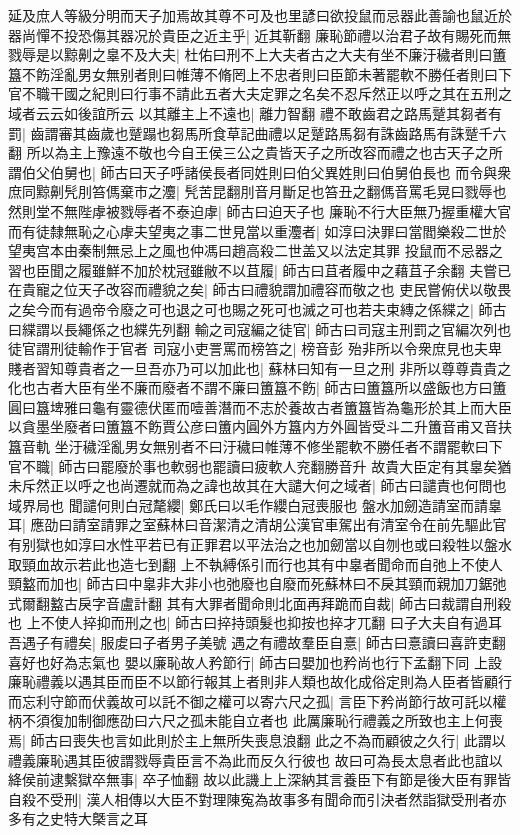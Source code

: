 延及庶人等級分明而天子加焉故其尊不可及也里諺曰欲投鼠而忌器此善諭也鼠近於器尚憚不投恐傷其器况於貴臣之近主乎|{
	近其靳翻}
廉恥節禮以治君子故有賜死而無戮辱是以黥劓之辠不及大夫|{
	杜佑曰刑不上大夫者古之大夫有坐不廉汙穢者則曰簠簋不飭淫亂男女無别者則曰帷薄不脩罔上不忠者則曰臣節未著罷軟不勝任者則曰下官不職干國之紀則曰行事不請此五者大夫定罪之名矣不忍斥然正以呼之其在五刑之域者云云如後誼所云}
以其離主上不遠也|{
	離力智翻}
禮不敢齒君之路馬蹵其芻者有罰|{
	齒謂審其齒歲也蹵蹋也芻馬所食草記曲禮以足蹵路馬芻有誅齒路馬有誅蹵千六翻}
所以為主上豫遠不敬也今自王侯三公之貴皆天子之所改容而禮之也古天子之所謂伯父伯舅也|{
	師古曰天子呼諸侯長者同姓則曰伯父異姓則曰伯舅伯長也}
而令與衆庶同黥劓髠刖笞傌棄市之灋|{
	髠苦昆翻刖音月斷足也笞丑之翻傌音罵毛晃曰戮辱也}
然則堂不無陛虖被戮辱者不泰迫虖|{
	師古曰迫天子也}
廉恥不行大臣無乃握重權大官而有徒隸無恥之心虖夫望夷之事二世見當以重灋者|{
	如淳曰決罪曰當閻樂殺二世於望夷宫本由秦制無忌上之風也仲馮曰趙高殺二世盖又以法定其罪}
投鼠而不忌器之習也臣聞之履雖鮮不加於枕冠雖敝不以苴履|{
	師古曰苴者履中之藉苴子余翻}
夫嘗已在貴寵之位天子改容而禮貌之矣|{
	師古曰禮貌謂加禮容而敬之也}
吏民嘗俯伏以敬畏之矣今而有過帝令廢之可也退之可也賜之死可也滅之可也若夫束縳之係緤之|{
	師古曰緤謂以長繩係之也緤先列翻}
輸之司寇編之徒官|{
	師古曰司寇主刑罰之官編次列也徒官謂刑徒輸作于官者}
司寇小吏詈罵而榜笞之|{
	榜音彭}
殆非所以令衆庶見也夫卑賤者習知尊貴者之一旦吾亦乃可以加此也|{
	蘇林曰知有一旦之刑}
非所以尊尊貴貴之化也古者大臣有坐不廉而廢者不謂不廉曰簠簋不飭|{
	師古曰簠簋所以盛飯也方曰簠圓曰簋埤雅曰龜有靈德伏匿而噎善潛而不志於養故古者簠簋皆為龜形於其上而大臣以貪墨坐廢者曰簠簋不飭賈公彦曰簠内圓外方簋内方外圓皆受斗二升簠音甫又音扶簋音軌}
坐汙穢淫亂男女無别者不曰汙穢曰帷薄不修坐罷軟不勝任者不謂罷軟曰下官不職|{
	師古曰罷廢於事也軟弱也罷讀曰疲軟人兖翻勝音升}
故貴大臣定有其辠矣猶未斥然正以呼之也尚遷就而為之諱也故其在大譴大何之域者|{
	師古曰譴責也何問也域界局也}
聞譴何則白冠氂纓|{
	鄭氏曰以毛作纓白冠喪服也}
盤水加劒造請室而請辠耳|{
	應劭曰請室請罪之室蘇林曰音潔清之清胡公漢官車駕出有清室令在前先驅此官有别獄也如淳曰水性平若已有正罪君以平法治之也加劒當以自刎也或曰殺牲以盤水取頸血故示若此也造七到翻}
上不執縛係引而行也其有中辠者聞命而自弛上不使人頸盭而加也|{
	師古曰中辠非大非小也弛廢也自廢而死蘇林曰不戾其頸而親加刀鋸弛式爾翻盭古戾字音盧計翻}
其有大罪者聞命則北面再拜跪而自裁|{
	師古曰裁謂自刑殺也}
上不使人捽抑而刑之也|{
	師古曰捽持頭髮也抑按也捽才兀翻}
曰子大夫自有過耳吾遇子有禮矣|{
	服䖍曰子者男子美號}
遇之有禮故羣臣自憙|{
	師古曰憙讀曰喜許吏翻喜好也好為志氣也}
嬰以廉恥故人矜節行|{
	師古曰嬰加也矜尚也行下孟翻下同}
上設廉恥禮義以遇其臣而臣不以節行報其上者則非人類也故化成俗定則為人臣者皆顧行而忘利守節而伏義故可以託不御之權可以寄六尺之孤|{
	言臣下矜尚節行故可託以權柄不須復加制御應劭曰六尺之孤未能自立者也}
此厲廉恥行禮義之所致也主上何喪焉|{
	師古曰喪失也言如此則於主上無所失喪息浪翻}
此之不為而顧彼之久行|{
	此謂以禮義廉恥遇其臣彼謂戮辱貴臣言不為此而反久行彼也}
故曰可為長太息者此也誼以絳侯前逮繫獄卒無事|{
	卒子恤翻}
故以此譏上上深納其言養臣下有節是後大臣有罪皆自殺不受刑|{
	漢人相傳以大臣不對理陳寃為故事多有聞命而引決者然詣獄受刑者亦多有之史特大槩言之耳}


